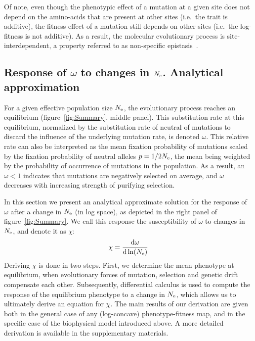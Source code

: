 \documentclass[authoryear]{elsarticle} %
\begin{document}
Of note, even though the phenotypic effect of a mutation at a given site does not depend on the amino-acids that are present at other sites (i.e.~the trait is additive), the fitness effect of a mutation still depends on other sites (i.e.~the log-fitness is not additive).
As a result, the molecular evolutionary process is site-interdependent, a property referred to as non-specific epistasis~\citep{Starr2016,Dasmeh2018}.

\subsection{Response of $\omega$ to changes in $N_{\text{e}}$. Analytical approximation}

For a given {effective population size} $N_{\text{e}}$, the evolutionary process reaches an equilibrium (figure~\ref{fig:Summary}, middle panel).
This {substitution} rate at this equilibrium, normalized by the {substitution} rate of {neutral} of mutations to discard the influence of the underlying mutation rate, is denoted $\omega$.
This relative rate can also be interpreted as the mean fixation probability of mutations scaled by the fixation probability of {neutral} {alleles} $p = 1 / {2 N_{\text{e}}}$, the mean being weighted by the probability of occurrence of mutations in the population.
As a result, an $\omega < 1$ indicates that mutations are negatively selected on average, and $\omega$ decreases with increasing strength of purifying selection.

In this section we present an analytical approximate solution for the response of $\omega$ after a change in $N_{\text{e}}$ (in log space), as depicted in the right panel of figure~\ref{fig:Summary}.
We call this response the susceptibility of $\omega$ to changes in $N_{\text{e}}$, and denote it as $\chi$:
\begin{align}
    \chi = \frac{ \mathrm{d} \omega}{\mathrm{d} \ln (N_{\text{e}})} \label{eq:chi}
\end{align}
Deriving $\chi$ is done in two steps.
First, we determine the mean {phenotype} at equilibrium, when evolutionary forces of mutation, selection and {genetic drift} compensate each other.
Subsequently, differential calculus is used to compute the response of the equilibrium {phenotype} to a change in $N_{\text{e}}$, which allows us to ultimately derive an equation for $\chi$.
The main results of our derivation are given both in the general case of any (log-concave) phenotype-fitness map, and in the specific case of the biophysical model introduced above.
A more detailed derivation is available in the supplementary materials.
\end{document}
